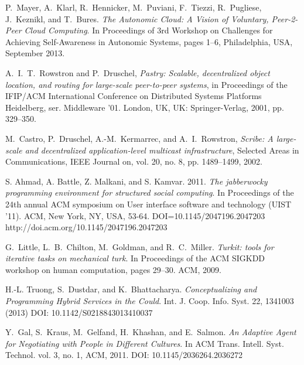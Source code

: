 \documentclass{llncs}
\begin{document}
\begin{thebibliography}{1}




P.~Mayer, A.~Klarl, R.~Hennicker, M.~Puviani, F.~Tiezzi, R.~Pugliese, J.~Keznikl, and T.~Bures. \emph{The Autonomic Cloud: A Vision of Voluntary, Peer-2-Peer Cloud Computing}. In Proceedings of 3rd Workshop on Challenges for Achieving Self-Awareness in Autonomic Systems, pages 1–6, Philadelphia, USA, September 2013.

A.~I.~T.~Rowstron and P.~Druschel, \emph{Pastry: Scalable, decentralized object location, and routing for large-scale peer-to-peer systems}, in Proceedings of the IFIP/ACM International Conference on Distributed Systems Platforms Heidelberg, ser. Middleware ’01. London, UK, UK: Springer-Verlag, 2001, pp. 329–350.

M.~Castro, P.~Druschel, A.-M.~Kermarrec, and A.~I.~Rowstron, \emph{Scribe: A large-scale and decentralized application-level multicast infrastructure}, Selected Areas in Communications, IEEE Journal on, vol. 20, no. 8, pp. 1489–1499, 2002.

S. Ahmad, A. Battle, Z. Malkani, and S. Kamvar. 2011. \emph{The jabberwocky programming environment for structured social computing}. In Proceedings of the 24th annual ACM symposium on User interface software and technology (UIST '11). ACM, New York, NY, USA, 53-64. DOI=10.1145/2047196.2047203 http://doi.acm.org/10.1145/2047196.2047203

G.~Little, L.~B.~Chilton, M.~Goldman, and R.~C.~Miller. \emph{Turkit: tools for iterative tasks on mechanical turk}. In Proceedings of the ACM SIGKDD workshop on human computation, pages 29–30. ACM, 2009.

 H.-L. Truong, S.~Dustdar, and K.~Bhattacharya. \emph{Conceptualizing and Programming Hybrid Services in the Could}. Int. J. Coop. Info. Syst. 22, 1341003 (2013) DOI: 10.1142/S0218843013410037

Y.~Gal, S.~Kraus, M.~Gelfand, H.~Khashan, and E.~Salmon. \emph{An Adaptive Agent for Negotiating with People in Different Cultures}. In  ACM Trans. Intell. Syst. Technol. vol. 3, no. 1, ACM, 2011. DOI: 10.1145/2036264.2036272

\end{thebibliography}
\end{document}
